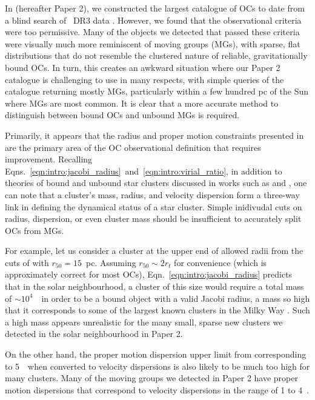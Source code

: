 In \citep{hunt_improving_open_2023} (hereafter Paper 2), we constructed the largest catalogue of OCs to date from a blind search of \gaia\ DR3 data \citep{gaia_collaboration_gaia_2022}. However, we found that the \cite{cantat-gaudin_clusters_2020} observational criteria were too permissive. Many of the objects we detected that passed these criteria were visually much more reminiscent of moving groups (MGs), with sparse, flat distributions that do not resemble the clustered nature of reliable, gravitationally bound OCs. In turn, this creates an awkward situation where our Paper 2 catalogue is challenging to use in many respects, with simple queries of the catalogue returning mostly MGs, particularly within a few hundred pc of the Sun where MGs are most common. It is clear that a more accurate method to distinguish between bound OCs and unbound MGs is required. 

Primarily, it appears that the radius and proper motion constraints presented in \cite{cantat-gaudin_clusters_2020} are the primary area of the OC observational definition that requires improvement. Recalling Eqns.~\ref{eqn:intro:jacobi_radius}~and~\ref{eqn:intro:virial_ratio}, in addition to theories of bound and unbound star clusters discussed in works such as \cite{portegies_zwart_young_2010} and \cite{krause_physics_2020}, one can note that a cluster's mass, radius, and velocity dispersion form a three-way link in defining the dynamical status of a star cluster. Simple inidivudal cuts on radius, dispersion, or even cluster mass should be insufficient to accurately split OCs from MGs.

For example, let us consider a cluster at the upper end of allowed radii from the cuts of \cite{cantat-gaudin_clusters_2020} with $r_{50}=15$~pc. Assuming $r_{50}\sim 2 r_t$ for convenience (which is approximately correct for most OCs), Eqn.~\ref{eqn:intro:jacobi_radius} predicts that in the solar neighbourhood, a cluster of this size would require a total mass of $\sim10^4$~\MSun\ in order to be a bound object with a valid Jacobi radius, a mass so high that it corresponds to some of the largest known clusters in the Milky Way \citep{portegies_zwart_young_2010,cantat-gaudin_milky_2022}. Such a high mass appears unrealistic for the many small, sparse new clusters we detected in the solar neighbourhood in Paper 2. 

On the other hand, the proper motion dispersion upper limit from \cite{cantat-gaudin_clusters_2020} corresponding to 5~\kms\ when converted to velocity dispersions is also likely to be much too high for many clusters. Many of the moving groups we detected in Paper 2 have proper motion dispersions that correspond to velocity dispersions in the range of 1 to 4~\kms. 

